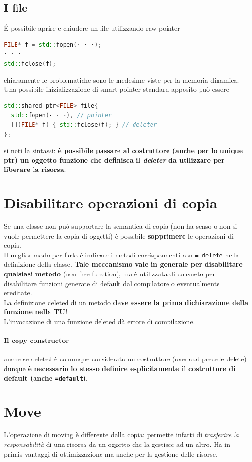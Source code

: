 \documentclass[10pt, oneside]{book}
\begin{document}
\subsection{I file}
\'E possibile aprire e chiudere un file utilizzando raw pointer
\begin{lstlisting}[language=C++]
FILE* f = std::fopen(· · ·);
· · ·
std::fclose(f);
\end{lstlisting}
chiaramente le problematiche sono le medesime viste per la memoria dinamica. Una possibile inizializzazione di smart pointer standard apposito può essere
\begin{lstlisting}[language=C++]
std::shared_ptr<FILE> file{
  std::fopen(· · ·), // pointer
  [](FILE* f) { std::fclose(f); } // deleter
};
\end{lstlisting}
si noti la sintassi: \textbf{è possibile passare al costruttore (anche per lo unique ptr) un oggetto funzione che definisca il \textit{deleter} da utilizzare per liberare la risorsa}.

\section{Disabilitare operazioni di copia}
Se una classe non può supportare la semantica di copia (non ha senso o non si vuole permettere la copia di oggetti) è possibile \textbf{sopprimere} le operazioni di copia.\\
Il miglior modo per farlo è indicare i metodi corrispondenti con \texttt{= delete} nella definizione della classe. \textbf{Tale meccanismo vale in generale per disabilitare qualsiasi metodo} (non free function), ma è utilizzata di consueto per disabilitare funzioni generate di default dal compilatore o eventualmente ereditate.\\
La definizione deleted di un metodo \textbf{deve essere la prima dichiarazione della funzione nella TU}!\\
L'invocazione di una funzione deleted dà errore di compilazione.

\paragraph{Il copy constructor} anche se deleted è comunque considerato un costruttore (overload precede delete) dunque \textbf{è necessario lo stesso definire esplicitamente il costruttore di default (anche \texttt{=default})}.

\section{Move}
L'operazione di moving è differente dalla copia: permette infatti di \textit{trasferire la responsabilità} di una risorsa da un oggetto che la gestisce ad un altro. Ha in primis vantaggi di ottimizzazione ma anche per la gestione delle risorse.
\end{document}
